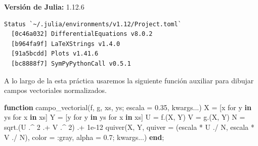 \documentclass[
  spanish,
  a4paper,
]{scrreport}
\newenvironment{Shaded}{\begin{snugshade}}{\end{snugshade}}
\newcommand{\FloatTok}[1]{\textcolor[rgb]{0.68,0.00,0.00}{#1}}
\newcommand{\FunctionTok}[1]{\textcolor[rgb]{0.28,0.35,0.67}{#1}}
\newcommand{\KeywordTok}[1]{\textcolor[rgb]{0.00,0.23,0.31}{\textbf{#1}}}
\newcommand{\NormalTok}[1]{\textcolor[rgb]{0.00,0.23,0.31}{#1}}
\newcommand{\OperatorTok}[1]{\textcolor[rgb]{0.37,0.37,0.37}{#1}}
\theoremstyle{definition}
\theoremstyle{remark}
\begin{document}
\begin{tcolorbox}[enhanced jigsaw, arc=.35mm, bottomrule=.15mm, bottomtitle=1mm, breakable, colback=white, colbacktitle=quarto-callout-note-color!10!white, colframe=quarto-callout-note-color-frame, coltitle=black, left=2mm, leftrule=.75mm, opacityback=0, opacitybacktitle=0.6, rightrule=.15mm, title=\textcolor{quarto-callout-note-color}{\faInfo}\hspace{0.5em}{Versiones de Julia y de los paquetes utilizados}, titlerule=0mm, toprule=.15mm, toptitle=1mm]

\textbf{Versión de Julia:} 1.12.6

\begin{verbatim}
Status `~/.julia/environments/v1.12/Project.toml`
  [0c46a032] DifferentialEquations v8.0.2
  [b964fa9f] LaTeXStrings v1.4.0
  [91a5bcdd] Plots v1.41.6
  [bc8888f7] SymPyPythonCall v0.5.1
\end{verbatim}

\end{tcolorbox}

A lo largo de la esta práctica usaremos la siguiente función auxiliar
para dibujar campos vectoriales normalizados.

\begin{Shaded}
\begin{Highlighting}[]
\KeywordTok{function} \FunctionTok{campo\_vectorial}\NormalTok{(f, g, xs, ys; escala }\OperatorTok{=} \FloatTok{0.35}\NormalTok{, kwargs}\OperatorTok{...}\NormalTok{)}
\NormalTok{    X }\OperatorTok{=}\NormalTok{ [x for y }\KeywordTok{in}\NormalTok{ ys for x }\KeywordTok{in}\NormalTok{ xs]}
\NormalTok{    Y }\OperatorTok{=}\NormalTok{ [y for y }\KeywordTok{in}\NormalTok{ ys for x }\KeywordTok{in}\NormalTok{ xs]}
\NormalTok{    U }\OperatorTok{=} \FunctionTok{f}\NormalTok{.(X, Y)}
\NormalTok{    V }\OperatorTok{=} \FunctionTok{g}\NormalTok{.(X, Y)}
\NormalTok{    N }\OperatorTok{=} \FunctionTok{sqrt}\NormalTok{.(U }\OperatorTok{.\^{}} \FloatTok{2} \OperatorTok{.+}\NormalTok{ V }\OperatorTok{.\^{}} \FloatTok{2}\NormalTok{) }\OperatorTok{.+} \FloatTok{1e{-}12}
    \FunctionTok{quiver}\NormalTok{(X, Y, quiver }\OperatorTok{=}\NormalTok{ (escala }\OperatorTok{*}\NormalTok{ U }\OperatorTok{./}\NormalTok{ N, escala }\OperatorTok{*}\NormalTok{ V }\OperatorTok{./}\NormalTok{ N),}
\NormalTok{           color }\OperatorTok{=} \OperatorTok{:}\NormalTok{gray, alpha }\OperatorTok{=} \FloatTok{0.7}\NormalTok{; kwargs}\OperatorTok{...}\NormalTok{)}
\KeywordTok{end}\NormalTok{;}
\end{Highlighting}
\end{Shaded}
\end{document}
